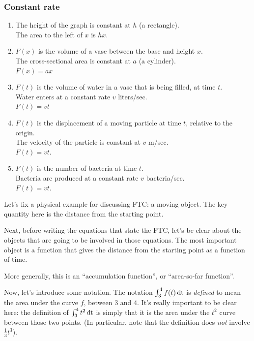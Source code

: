 \documentclass[12pt]{article}
\begin{document}
\subsubsection*{Constant rate}
\begin{enumerate}
\item The height of the graph is constant at $h$ (a rectangle).\\
      The area to the left of $x$ is $hx$.\\

\item $F(x)$ is the volume of a vase between the base and height $x$. \\
      The cross-sectional area is constant at $a$ (a cylinder).\\
      $F(x) = ax$\\

\item $F(t)$ is the volume of water in a vase that is being filled, at time $t$.\\
      Water enters at a constant rate $v$ liters/sec.\\
      $F(t) = vt$\\

\item $F(t)$ is the displacement of a moving particle at time $t$, relative to the origin.\\
      The velocity of the particle is constant at $v$ m/sec.\\
      $F(t) = vt$.\\

\item $F(t)$ is the number of bacteria at time $t$.\\
      Bacteria are produced at a constant rate $v$ bacteria/sec.\\
      $F(t) = vt$.
\end{enumerate}


\newpage
Let's fix a physical example for discussing FTC: a moving object. The key
quantity here is the distance from the starting point.

Next, before writing the equations that state the FTC, let's be clear about the
objects that are going to be involved in those equations. The most important
object is a function that gives the distance from the starting point as a
function of time.

More generally, this is an ``accumulation function'', or ``area-so-far
function''.

Now, let's introduce some notation. The notation $\int_3^4 f(t) \operatorname{\text{dt}}$ is
\textit{defined} to mean the area under the curve $f$, between $3$ and
$4$. It's really important to be clear here: the definition of
$\int_3^4 t^2 \operatorname{\text{dt}}$ is simply that it is the area under the $t^2$ curve between
those two points. (In particular, note that the definition does \textit{not}
involve $\frac{1}{3}t^3$).
\end{document}
